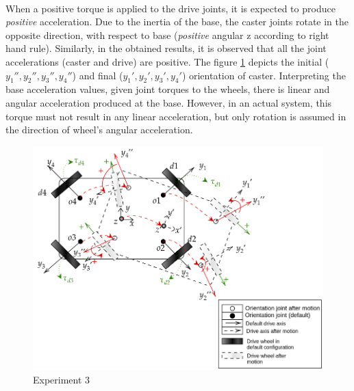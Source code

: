 \paragraph{}When a positive torque is applied to the drive joints, it is expected to produce \textit{positive} acceleration. Due to the inertia of the base, the caster joints rotate in the opposite direction, with respect to base (\textit{positive} angular z according to right hand rule). Similarly, in the obtained results, it is observed that all the joint accelerations (caster and drive) are positive. The figure \ref{fig:exp3} depicts the initial ($y_1'', y_2'', y_3'', y_4''$) and final ($y_1', y_2', y_3', y_4'$) orientation of caster. 
Interpreting the base acceleration values, given joint torques to the wheels, there is linear and angular acceleration produced at the base. However, in an actual system, this torque must not result in any linear acceleration, but only rotation is assumed in the direction of wheel's angular acceleration.




\begin{figure}[h!]
	\begin{center}
		\includegraphics[scale=0.46]{images/exp3.png}
	\end{center}
	\caption{Experiment 3}
	\label{fig:exp3}
\end{figure}

